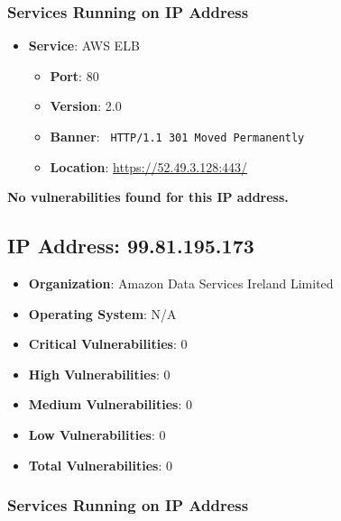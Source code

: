 \documentclass{article}
\begin{document}
\subsubsection*{Services Running on IP Address}

\begin{itemize}
    
        \item \textbf{Service}: AWS ELB
        \begin{itemize}
            \item \textbf{Port}: 80
            \item \textbf{Version}:  2.0 
            \item \textbf{Banner}: \texttt{ HTTP/1.1 301 Moved Permanently
 }
            \item \textbf{Location}: \href{ https://52.49.3.128:443/ }{ https://52.49.3.128:443/ }
        \end{itemize}
    
\end{itemize}


\textbf{No vulnerabilities found for this IP address.}


\clearpage



\subsection*{IP Address: 99.81.195.173}

\begin{itemize}
    \item \textbf{Organization}: Amazon Data Services Ireland Limited
    \item \textbf{Operating System}:  N/A 
    \item \textbf{Critical Vulnerabilities}: 0
    \item \textbf{High Vulnerabilities}: 0
    \item \textbf{Medium Vulnerabilities}: 0
    \item \textbf{Low Vulnerabilities}: 0
    \item \textbf{Total Vulnerabilities}: 0
\end{itemize}

\subsubsection*{Services Running on IP Address}
\end{document}
